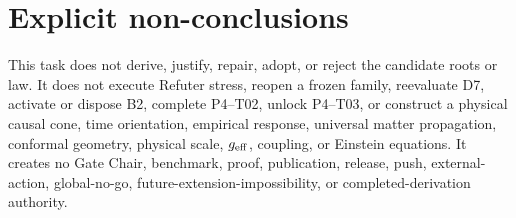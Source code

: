 \documentclass[11pt]{article}
\begin{document}
\section{Explicit non-conclusions}

This task does not derive, justify, repair, adopt, or reject the candidate
roots or law.  It does not execute Refuter stress, reopen a frozen family,
reevaluate D7, activate or dispose B2, complete P4--T02, unlock P4--T03, or
construct a physical causal cone, time orientation, empirical response,
universal matter propagation, conformal geometry, physical scale,
\(g_{\rm eff}\), coupling, or Einstein equations.  It creates no Gate Chair,
benchmark, proof, publication, release, push, external-action, global-no-go,
future-extension-impossibility, or completed-derivation authority.
\end{document}
